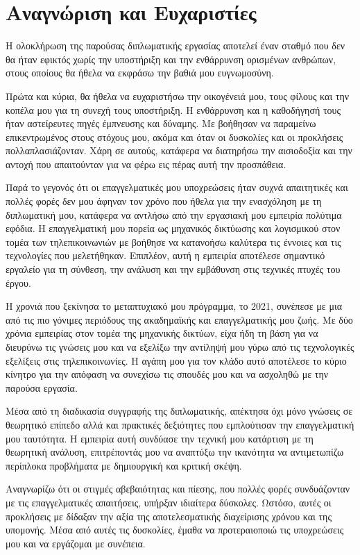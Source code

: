 
\chapter{Αναγνώριση και Ευχαριστίες}

Η ολοκλήρωση της παρούσας διπλωματικής εργασίας αποτελεί έναν σταθμό που δεν θα ήταν εφικτός χωρίς την υποστήριξη και την ενθάρρυνση ορισμένων ανθρώπων, στους οποίους θα ήθελα να εκφράσω την βαθιά μου ευγνωμοσύνη.

Πρώτα και κύρια, θα ήθελα να ευχαριστήσω την οικογένειά μου, τους φίλους και την  κοπέλα μου για τη συνεχή τους υποστήριξη. Η ενθάρρυνση και η καθοδήγησή τους ήταν αστείρευτες πηγές έμπνευσης και δύναμης. Με βοήθησαν να παραμείνω επικεντρωμένος στους στόχους μου, ακόμα και όταν οι δυσκολίες και οι προκλήσεις πολλαπλασιάζονταν. Χάρη σε αυτούς, κατάφερα να διατηρήσω την αισιοδοξία και την αντοχή που απαιτούνταν για να φέρω εις πέρας αυτή την προσπάθεια.

Παρά το γεγονός ότι οι επαγγελματικές μου υποχρεώσεις ήταν συχνά απαιτητικές και πολλές φορές δεν μου άφηναν τον χρόνο που ήθελα για την ενασχόληση με τη διπλωματική μου, κατάφερα να αντλήσω από την εργασιακή μου εμπειρία πολύτιμα εφόδια. Η επαγγελματική μου πορεία ως μηχανικός δικτύωσης και λογισμικού στον τομέα των τηλεπικοινωνιών με βοήθησε να κατανοήσω καλύτερα τις έννοιες και τις τεχνολογίες που μελετήθηκαν. Επιπλέον, αυτή η εμπειρία αποτέλεσε σημαντικό εργαλείο για τη σύνθεση, την ανάλυση και την εμβάθυνση στις τεχνικές πτυχές του έργου.

Η χρονιά που ξεκίνησα το μεταπτυχιακό μου πρόγραμμα, το 2021, συνέπεσε με μια από τις πιο γόνιμες περιόδους της ακαδημαϊκής και επαγγελματικής μου ζωής. Με δύο χρόνια εμπειρίας στον τομέα της μηχανικής δικτύων, είχα ήδη τη βάση για να διευρύνω τις γνώσεις μου και να εξελίξω την αντίληψή μου γύρω από τις τεχνολογικές εξελίξεις στις τηλεπικοινωνίες. Η αγάπη μου για τον κλάδο αυτό αποτέλεσε το κύριο κίνητρο για την απόφαση να συνεχίσω τις σπουδές μου και να ασχοληθώ με την παρούσα εργασία.

Μέσα από τη διαδικασία συγγραφής της διπλωματικής, απέκτησα όχι μόνο γνώσεις σε θεωρητικό επίπεδο αλλά και πρακτικές δεξιότητες που εμπλούτισαν την επαγγελματική μου ταυτότητα. Η εμπειρία αυτή συνδύασε την τεχνική μου κατάρτιση με τη θεωρητική ανάλυση, επιτρέποντάς μου να αναπτύξω την ικανότητα να αντιμετωπίζω περίπλοκα προβλήματα με δημιουργική και κριτική σκέψη.

Αναγνωρίζω ότι οι στιγμές αβεβαιότητας και πίεσης, που πολλές φορές συνδυάζονταν με τις επαγγελματικές απαιτήσεις, υπήρξαν ιδιαίτερα δύσκολες. Ωστόσο, αυτές οι προκλήσεις με δίδαξαν την αξία της αποτελεσματικής διαχείρισης χρόνου και της υπομονής. Μέσα από αυτές τις δυσκολίες, έμαθα να προτεραιοποιώ τις υποχρεώσεις μου και να εργάζομαι με συνέπεια.

